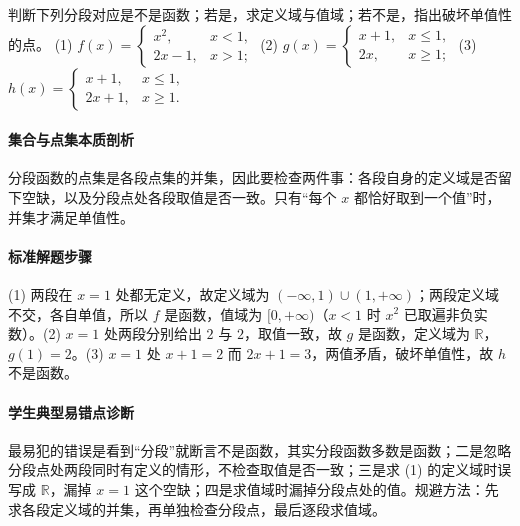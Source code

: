\begin{problem}
判断下列分段对应是不是函数；若是，求定义域与值域；若不是，指出破坏单值性的点。
(1) $f(x)=\begin{cases}x^2,&x<1,\\2x-1,&x>1;\end{cases}$
(2) $g(x)=\begin{cases}x+1,&x\leq1,\\2x,&x\geq1;\end{cases}$
(3) $h(x)=\begin{cases}x+1,&x\leq1,\\2x+1,&x\geq1.\end{cases}$
\end{problem}
\begin{solution}
\paragraph{集合与点集本质剖析}
分段函数的点集是各段点集的并集，因此要检查两件事：各段自身的定义域是否留下空缺，以及分段点处各段取值是否一致。只有“每个 $x$ 都恰好取到一个值”时，并集才满足单值性。
\paragraph{标准解题步骤}
(1) 两段在 $x=1$ 处都无定义，故定义域为 $(-\infty,1)\cup(1,+\infty)$；两段定义域不交，各自单值，所以 $f$ 是函数，值域为 $[0,+\infty)$（$x<1$ 时 $x^2$ 已取遍非负实数）。(2) $x=1$ 处两段分别给出 $2$ 与 $2$，取值一致，故 $g$ 是函数，定义域为 $\mathbb{R}$，$g(1)=2$。(3) $x=1$ 处 $x+1=2$ 而 $2x+1=3$，两值矛盾，破坏单值性，故 $h$ 不是函数。
\paragraph{学生典型易错点诊断}
最易犯的错误是看到“分段”就断言不是函数，其实分段函数多数是函数；二是忽略分段点处两段同时有定义的情形，不检查取值是否一致；三是求 (1) 的定义域时误写成 $\mathbb{R}$，漏掉 $x=1$ 这个空缺；四是求值域时漏掉分段点处的值。规避方法：先求各段定义域的并集，再单独检查分段点，最后逐段求值域。
\end{solution}


